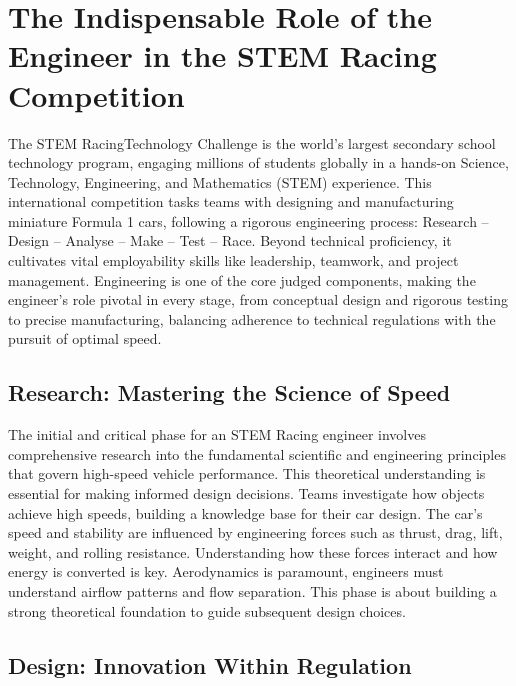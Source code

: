 \chapter{The Indispensable Role of the Engineer in the STEM Racing Competition}

The STEM RacingTechnology Challenge is the world's largest secondary school technology program, engaging millions of students globally in a hands-on Science, Technology, Engineering, and Mathematics (STEM) experience. This international competition tasks teams with designing and manufacturing miniature Formula 1 cars, following a rigorous engineering process: Research – Design – Analyse – Make – Test – Race. Beyond technical proficiency, it cultivates vital employability skills like leadership, teamwork, and project management. Engineering is one of the core judged components, making the engineer's role pivotal in every stage, from conceptual design and rigorous testing to precise manufacturing, balancing adherence to technical regulations with the pursuit of optimal speed.

\section{Research: Mastering the Science of Speed}

The initial and critical phase for an STEM Racing engineer involves comprehensive research into the fundamental scientific and engineering principles that govern high-speed vehicle performance. This theoretical understanding is essential for making informed design decisions. Teams investigate how objects achieve high speeds, building a knowledge base for their car design. The car's speed and stability are influenced by engineering forces such as thrust, drag, lift, weight, and rolling resistance. Understanding how these forces interact and how energy is converted is key. Aerodynamics is paramount, engineers must understand airflow patterns and flow separation. This phase is about building a strong theoretical foundation to guide subsequent design choices.

\section{Design: Innovation Within Regulation}

